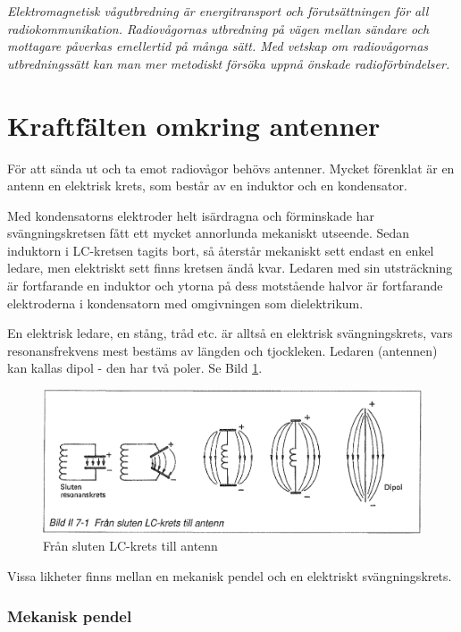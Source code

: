 \emph{Elektromagnetisk vågutbredning är energitransport och
  förutsättningen för all radiokommunikation. Radiovågornas utbredning
  på vägen mellan sändare och mottagare påverkas emellertid på många
  sätt. Med vetskap om radiovågornas utbredningssätt kan man mer
  metodiskt försöka uppnå önskade radioförbindelser.}

\section{Kraftfälten omkring antenner}

För att sända ut och ta emot radiovågor behövs antenner. Mycket
förenklat är en antenn en elektrisk krets, som består av en induktor
och en kondensator.

Med kondensatorns elektroder helt isärdragna och förminskade har
svängningskretsen fått ett mycket annorlunda mekaniskt utseende. Sedan
induktorn i LC-kretsen tagits bort, så återstår mekaniskt sett endast
en enkel ledare, men elektriskt sett finns kretsen ändå kvar. Ledaren
med sin utsträckning är fortfarande en induktor och ytorna på dess
motstående halvor är fortfarande elektroderna i kondensatorn med
omgivningen som dielektrikum.

En elektrisk ledare, en stång, tråd etc. är alltså en elektrisk
svängningskrets, vars resonansfrekvens mest bestäms av längden och
tjockleken. Ledaren (antennen) kan kallas dipol - den har två
poler. Se Bild \ref{fig:BildII7-01}.

\begin{figure}
\includegraphics[width=\textwidth]{images/bild_2_7-01}
\caption{Från sluten LC-krets till antenn}
\label{fig:BildII7-01}
\end{figure}

Vissa likheter finns mellan en mekanisk pendel och en elektriskt
svängningskrets.

\subsubsection{Mekanisk pendel}

